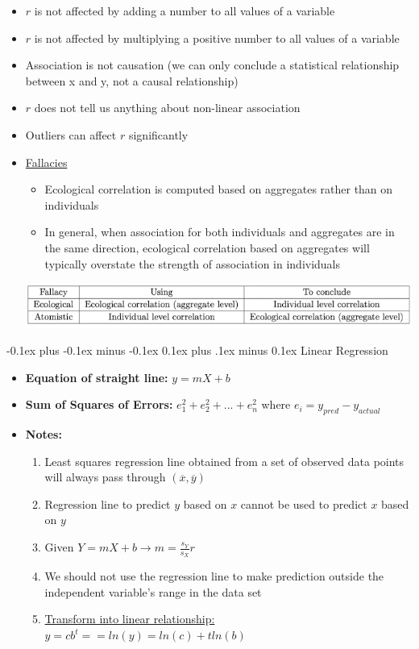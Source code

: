 \documentclass[landscape]{article}
\makeatletter
\renewcommand{\subsection}{\@startsection{subsection}{2}{0mm}%
  {-0.1ex plus -0.1ex minus -0.1ex}%
  {0.1ex plus .1ex minus 0.1ex}%
{\normalfont\scriptsize\bfseries}}
\makeatother
\begin{document}
\begin{multicols*}{5}
\begin{itemize}
      \item $r$ is not affected by adding a number to all values of a variable
      \item $r$ is not affected by multiplying a positive number to all values of a variable
      \item Association is not causation (we can only conclude a statistical relationship between x and y, not a causal relationship)
      \item $r$ does not tell us anything about non-linear association
      \item Outliers can affect $r$ significantly
      \item \underline{Fallacies}
      \begin{itemize} 
        \item Ecological correlation is computed based on aggregates rather than on individuals
        \item In general, when association for both individuals and aggregates are in the same direction, ecological correlation based on aggregates will typically overstate the strength of association in individuals
      \end{itemize}
      \includegraphics[width=1.0\linewidth]{8_fallacies.png}
    \end{itemize}

    \subsection{Linear Regression}
    \begin{itemize}
      \item \textbf{Equation of straight line:} $y=mX+b$
      \item \textbf{Sum of Squares of Errors:} $e_1^2 + e_2^2 + ... + e_n^2$ where $e_i = y_{pred} - y_{actual}$
      \item \textbf{Notes:}
      \begin{enumerate}
        \item Least squares regression line obtained from a set of observed data points will always pass through $(\overline{x}, \overline{y})$
        \item Regression line to predict $y$ based on $x$ cannot be used to predict $x$ based on $y$
        \item Given $Y=mX+b \rightarrow m = \frac{s_Y}{s_X}r$ 
        \item We should not use the regression line to make prediction outside the independent variable's range in the data set
        \item \underline{Transform into linear relationship:} $y=cb^t == ln(y) = ln(c) + tln(b)$
      \end{enumerate}
    \end{itemize}
    

\end{multicols*}
\end{document}
